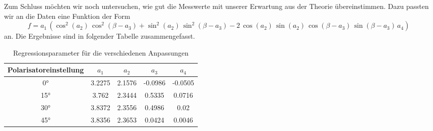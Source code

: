 \documentclass[a4paper, 12pt,]{scrartcl}
\begin{document}
 Zum Schluss möchten wir noch untersuchen, wie gut die Messwerte mit unserer Erwartung aus der Theorie übereinstimmen. Dazu passten wir an die Daten eine Funktion der Form $$f=a_1\,\left(\cos^2(a_2)\,\cos^2(\beta-a_3)+\sin^2(a_2)\,\sin^2(\beta-a_3)-2\,\cos(a_2)\,\sin(a_2)\,\cos(\beta-a_3)\,\sin(\beta-a_3)\,a_4\right)$$
an. Die Ergebnisse sind in folgender Tabelle zusammengefasst.
\begin{table}[H]\centering\begin{tabular}{|c |c |c |c |c |}\hline{Polarisatoreinstellung}&$a_1$&$a_2$&$a_3$&$a_4$\\\hline
0°&3.2275&2.1576&-0.0986&-0.0505\\\hline
15°&3.762&2.3444&0.5335&0.0716\\\hline
30°&3.8372&2.3556&0.4986&0.02\\\hline
45°&3.8356&2.3653&0.0424&0.0046\\\hline\end{tabular}\caption{Regressionsparameter für die verschiedenen Anpassungen}\end{table}
\end{document}
